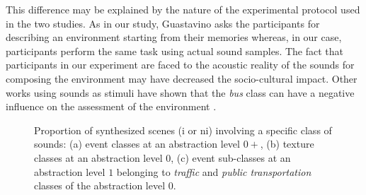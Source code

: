 \documentclass[twoside,twocolumn]{article}
\begin{document}
This difference may be explained by the nature of the experimental protocol used in the two studies. As in our study, Guastavino asks the participants for describing an environment starting from their memories whereas, in our case, participants perform the same task using actual sound samples. The fact that participants in our experiment are faced to the acoustic reality of the sounds for composing the environment may have decreased the socio-cultural impact. Other works using sounds as stimuli have shown that the \emph{bus} class can have a negative influence on the assessment of the environment \cite{lavandier2006contribution}.

\begin{figure}[t]
        \myfloatalign
         \par
       \caption{Proportion of synthesized scenes (i or ni) involving a specific class of sounds: (a) event classes at an abstraction level $0+$, (b) texture classes at an abstraction level $0$, (c) event sub-classes at an abstraction level $1$ belonging to \emph{traffic} and \emph{public transportation} classes of the abstraction level $0$.}\label{fig:soundsource}
\end{figure}
\end{document}
